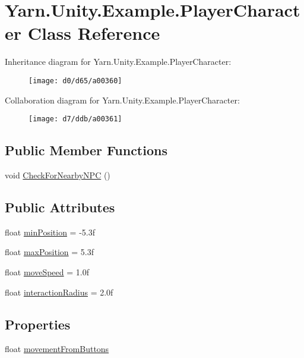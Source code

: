 \hypertarget{a00065}{\section{Yarn.\-Unity.\-Example.\-Player\-Character Class Reference}
\label{a00065}
}


Inheritance diagram for Yarn.\-Unity.\-Example.\-Player\-Character\-:
\nopagebreak
\begin{figure}[H]
\begin{center}
\leavevmode
\texttt{[image: d0/d65/a00360]}
\end{center}
\end{figure}


Collaboration diagram for Yarn.\-Unity.\-Example.\-Player\-Character\-:
\nopagebreak
\begin{figure}[H]
\begin{center}
\leavevmode
\texttt{[image: d7/ddb/a00361]}
\end{center}
\end{figure}
\subsection*{Public Member Functions}
\begin{DoxyCompactItemize}
\item 
void \hyperlink{a00065_a574b6d984b8671c7a780d3d10e040a9b}{Check\-For\-Nearby\-N\-P\-C} ()
\end{DoxyCompactItemize}
\subsection*{Public Attributes}
\begin{DoxyCompactItemize}
\item 
float \hyperlink{a00065_ac025d4f4afaf854f8256e0d2d03e5b52}{min\-Position} = -\/5.\-3f
\item 
float \hyperlink{a00065_ada9dd748a1d89a7f9b12ac8967a07ae6}{max\-Position} = 5.\-3f
\item 
float \hyperlink{a00065_adc602a4b2c7e44e4b15a11f1ffcf07e4}{move\-Speed} = 1.\-0f
\item 
float \hyperlink{a00065_af89807d2195915ee9a0c42317e110fc6}{interaction\-Radius} = 2.\-0f
\end{DoxyCompactItemize}
\subsection*{Properties}
\begin{DoxyCompactItemize}
\item 
float \hyperlink{a00065_a7bcde19f080bfd09bbc833b8fb555cf7}{movement\-From\-Buttons}
\end{DoxyCompactItemize}

